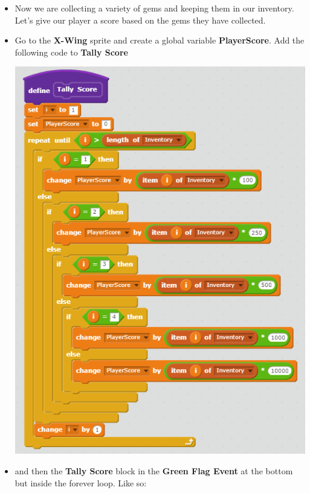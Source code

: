 \documentclass[12pt]{article}
\begin{document}
	\begin{itemize}
		\item Now we are collecting a variety of gems and keeping them in our inventory. Let's give our player a score based on the gems they have collected.

		\item Go to the \textbf{X-Wing} sprite and create a global variable \textbf{PlayerScore}. Add the following code to \textbf{Tally Score} 

		\begin{center}
  			\includegraphics[scale = 0.5]{./Images/XWing_CountScore.png}
		\end{center}
		\newpage
		\item and then the \textbf{Tally Score} block in the \textbf{Green Flag Event} at the bottom but inside the forever loop. Like so:
	

\end{itemize}
\end{document}
